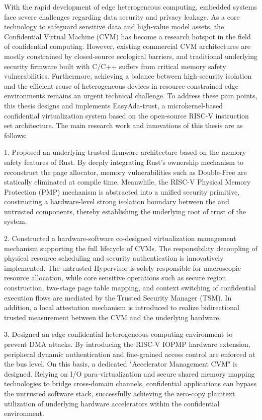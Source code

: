 \documentclass[master, vlined, review]{DissertUESTC}
\begin{document}
	
	\enabstract
	With the rapid development of edge heterogeneous computing, embedded systems face severe challenges regarding data security and privacy leakage. As a core technology to safeguard sensitive data and high-value model assets, the Confidential Virtual Machine (CVM) has become a research hotspot in the field of confidential computing. However, existing commercial CVM architectures are mostly constrained by closed-source ecological barriers, and traditional underlying security firmware built with C/C++ suffers from critical memory safety vulnerabilities. Furthermore, achieving a balance between high-security isolation and the efficient reuse of heterogeneous devices in resource-constrained edge environments remains an urgent technical challenge. To address these pain points, this thesis designs and implements EasyAda-trust, a microkernel-based confidential virtualization system based on the open-source RISC-V instruction set architecture. The main research work and innovations of this thesis are as follows:
	
	1. Proposed an underlying trusted firmware architecture based on the memory safety features of Rust. By deeply integrating Rust's ownership mechanism to reconstruct the page allocator, memory vulnerabilities such as Double-Free are statically eliminated at compile time. Meanwhile, the RISC-V Physical Memory Protection (PMP) mechanism is abstracted into a unified security primitive, constructing a hardware-level strong isolation boundary between the  and untrusted components, thereby establishing the underlying root of trust of the system.
	
	2. Constructed a hardware-software co-designed virtualization management mechanism supporting the full lifecycle of CVMs. The responsibility decoupling of physical resource scheduling and security authentication is innovatively implemented. The untrusted Hypervisor is solely responsible for macroscopic resource allocation, while core sensitive operations such as secure region construction, two-stage page table mapping, and context switching of confidential execution flows are mediated by the Trusted Security Manager (TSM). In addition, a local attestation mechanism is introduced to realize bidirectional trusted measurement between the CVM and the underlying hardware.
	
	3. Designed an edge confidential heterogeneous computing environment to prevent DMA attacks. By introducing the RISC-V IOPMP hardware extension, peripheral dynamic authentication and fine-grained access control are enforced at the bus level. On this basis, a dedicated "Accelerator Management CVM" is designed. Relying on I/O para-virtualization and secure shared memory mapping technologies to bridge cross-domain channels, confidential applications can bypass the untrusted software stack, successfully achieving the zero-copy plaintext utilization of underlying hardware accelerators within the confidential environment.
	
\end{document}
